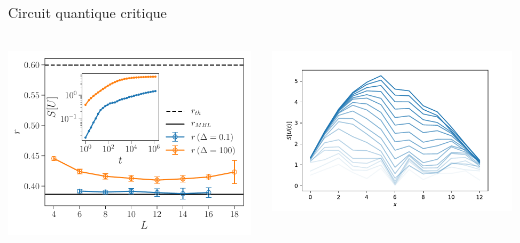 \begin{frame}{Circuit quantique critique}
\begin{columns}
\begin{column}{0.5\textwidth}
\centering
\includegraphics[width=\columnwidth]{img/4_questions/rgaps}
\end{column}
\begin{column}{0.5\textwidth}
\centering
\includegraphics[width=\columnwidth]{img/4_questions/OpEnt_bottlenecks}
\end{column}
\end{columns}
\end{frame}

